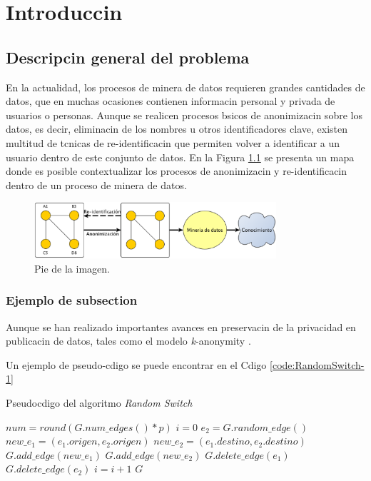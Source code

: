 \chapter{Introduccin}
\label{chapter:introduccion}


\section{Descripcin general del problema}

En la actualidad, los procesos de minera de datos requieren grandes cantidades de datos, que en muchas ocasiones contienen informacin personal y privada de usuarios o personas. Aunque se realicen procesos bsicos de anonimizacin sobre los datos, es decir, eliminacin de los nombres u otros identificadores clave, existen multitud de tcnicas de re-identificacin que permiten volver a identificar a un usuario dentro de este conjunto de datos. En la Figura \ref{fig:context-anoni1} se presenta un mapa donde es posible contextualizar los procesos de anonimizacin y re-identificacin dentro de un proceso de minera de datos.

\begin{figure}
	\centering
	\includegraphics[width=0.8\textwidth]{figs/intro-1}
	\caption{Pie de la imagen.}
	\label{fig:context-anoni1}
\end{figure}

\subsection{Ejemplo de subsection}

Aunque se han realizado importantes avances en preservacin de la privacidad en publicacin de datos, tales como el modelo \textit{k}-anonymity \cite{Sweeney:2002}.

Un ejemplo de pseudo-cdigo se puede encontrar en el Cdigo \ref{code:RandomSwitch-1}

\begin{algorithm}
	\caption{Pseudocdigo del algoritmo \textit{Random Switch}}
	\label{code:RandomSwitch-1}
	\begin{algorithmic}
		\STATE $num = round(G.num\_edges() * p)$
		\STATE $i = 0$
		\STATE $e_{2} = G.random\_edge()$
		\STATE $new\_e_{1} = (e_{1}.origen, e_{2}.origen)$
		\STATE $new\_e_{2} = (e_{1}.destino, e_{2}.destino)$
		\STATE $G.add\_edge(new\_e_{1})$
		\STATE $G.add\_edge(new\_e_{2})$
		\STATE $G.delete\_edge(e_{1})$
		\STATE $G.delete\_edge(e_{2})$
		\STATE $i=i+1$
		\ENDIF
		\ENDWHILE
		\RETURN $G$
	\end{algorithmic}
\end{algorithm}

